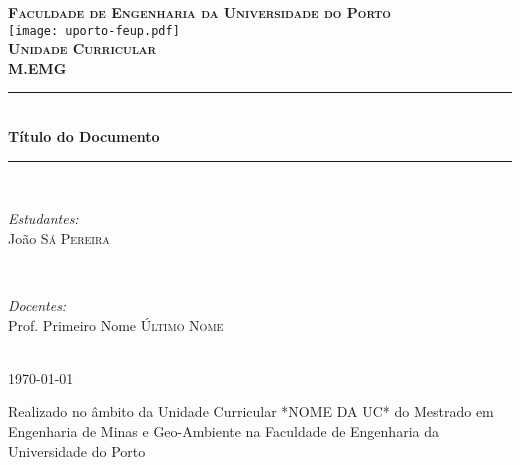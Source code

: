 \begin{titlepage}

    \newcommand{\HRule}[1]{\rule{\linewidth}{#1}} 

    \center      


    \textbf{\textsc{\Large Faculdade de Engenharia da Universidade do Porto}\\[2.5cm]}
    \texttt{[image: uporto-feup.pdf]}\\[2cm] 
    \textsc{\Large \bfseries Unidade Curricular}\\[0.5cm] %
    \textsc{\large \bfseries M.EMG}\\[1cm] %
    
    
    \HRule{0.5pt} \\[0.4cm]
    { \LARGE{\bfseries Título do Documento}} \\
    \HRule{2pt} \\[2cm]


    \begin{minipage}{0.4\textwidth}
        \begin{flushleft} \large
        \emph{Estudantes:}\\
        João \textsc{Sá Pereira} %
        \end{flushleft}
        \end{minipage}
        ~
        \begin{minipage}{0.4\textwidth}
        \begin{flushright} \large
        \emph{Docentes:} \\
        Prof. Primeiro Nome \textsc{Último Nome} %
        \end{flushright}
        \end{minipage}\\[2.5cm]
    
    
   
    {\large \today}\\[1cm]

    \vfill

    \small{Realizado no âmbito da Unidade Curricular *NOME DA UC* do Mestrado em Engenharia de Minas e Geo-Ambiente na Faculdade de Engenharia da Universidade do Porto}
    

\end{titlepage}